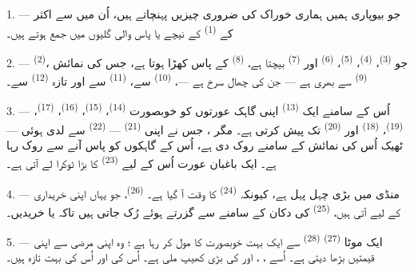 \VUsaut{4.0mm}
\VUsaut{3.0mm}

\VUsaut{3.0mm}

1. --- جو بیوپاری ہمیں ہماری خوراک کی ضروری چیزیں پہنچاتے ہیں، اُن
میں سے اکثر  کے  \textsuperscript{(1)}
کے نیچے یا پاس والی گلیوں میں جمع ہوتے ہیں۔

2. ---  \textsuperscript{(2)}، جو
 \textsuperscript{(3)}، 
\textsuperscript{(4)}،  \textsuperscript{(5)}،
 \textsuperscript{(6)} اور 
\textsuperscript{(7)} بیچتا ہے، 
\textsuperscript{(8)} کے پاس کھڑا ہوتا ہے، جس کی نمائش
 \textsuperscript{(9)} سے بھری ہے — جن کی چھال
سرخ ہے —،  \textsuperscript{(10)} سے،
 \textsuperscript{(11)} سے اور تازہ
 \textsuperscript{(12)} سے۔

3. --- اُس کے سامنے ایک  \textsuperscript{(13)}
اپنی گاہک عورتوں کو خوبصورت  \textsuperscript{(14)}،
 \textsuperscript{(15)}، 
\textsuperscript{(16)}،  \textsuperscript{(17)}،
 \textsuperscript{(19)}، 
\textsuperscript{(18)} اور  \textsuperscript{(20)} تک
پیش کرتی ہے۔ مگر ، جس نے اپنی  \textsuperscript{(21)} — 
\textsuperscript{(22)} سے لدی ہوئی — ٹھیک اُس کی نمائش کے سامنے روک
دی ہے، اُس کے گاہکوں کو پاس آنے سے روک رہا ہے۔ ایک باغبان عورت اُس
کے لیے  \textsuperscript{(23)} کا بڑا ٹوکرا لے آتی
ہے۔

\VUsaut{4.0mm}
\VUsaut{3.0mm}

4. --- منڈی میں بڑی چہل پہل ہے، کیونکہ 
\textsuperscript{(24)} کا وقت آ گیا ہے۔ 
\textsuperscript{(26)}، جو یہاں اپنی خریداری کے لیے آتی ہیں،
 \textsuperscript{(25)} کی دکان کے سامنے سے
گزرتے ہوئے رُک جاتی ہیں تاکہ  یا  خریدیں۔

5. --- ایک موٹا  \textsuperscript{(27)}
 \textsuperscript{(28)} سے ایک بہت خوبصورت
 کا مول کر رہا ہے ؛ وہ اپنی مرضی سے اپنی قیمتیں بڑھا
دیتی ہے۔ اُسے ، ، 
اور  کی بڑی کھیپ ملی ہے۔ اُس کی  اور اُس کی
 بہت تازہ ہیں۔

